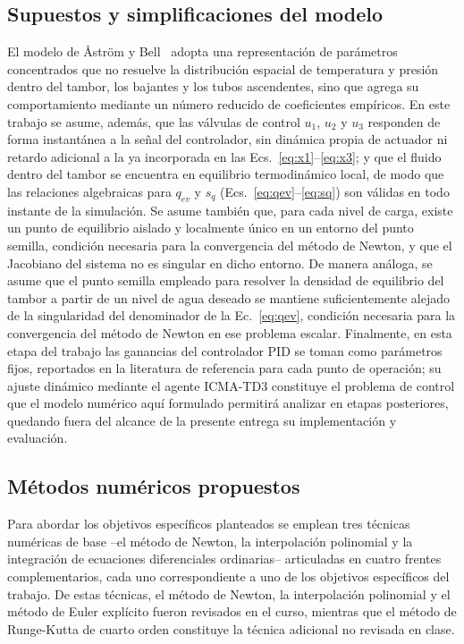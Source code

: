 \documentclass[final,5p,times,twocolumn,authoryear,11pt]{elsarticle}
\begin{document}
\subsection{Supuestos y simplificaciones del modelo}

El modelo de Åström y Bell~\citep{astrom2000drum} adopta una representación de parámetros concentrados que no resuelve la distribución espacial de temperatura y presión dentro del tambor, los bajantes y los tubos ascendentes, sino que agrega su comportamiento mediante un número reducido de coeficientes empíricos. En este trabajo se asume, además, que las válvulas de control $u_1$, $u_2$ y $u_3$ responden de forma instantánea a la señal del controlador, sin dinámica propia de actuador ni retardo adicional a la ya incorporada en las Ecs.~\eqref{eq:x1}--\eqref{eq:x3}; y que el fluido dentro del tambor se encuentra en equilibrio termodinámico local, de modo que las relaciones algebraicas para $q_{ev}$ y $s_q$ (Ecs.~\eqref{eq:qev}--\eqref{eq:sq}) son válidas en todo instante de la simulación. Se asume también que, para cada nivel de carga, existe un punto de equilibrio aislado y localmente único en un entorno del punto semilla, condición necesaria para la convergencia del método de Newton, y que el Jacobiano del sistema no es singular en dicho entorno. De manera análoga, se asume que el punto semilla empleado para resolver la densidad de equilibrio del tambor a partir de un nivel de agua deseado se mantiene suficientemente alejado de la singularidad del denominador de la Ec.~\eqref{eq:qev}, condición necesaria para la convergencia del método de Newton en ese problema escalar. Finalmente, en esta etapa del trabajo las ganancias del controlador PID se toman como parámetros fijos, reportados en la literatura de referencia para cada punto de operación; su ajuste dinámico mediante el agente ICMA-TD3 constituye el problema de control que el modelo numérico aquí formulado permitirá analizar en etapas posteriores, quedando fuera del alcance de la presente entrega su implementación y evaluación.

\subsection{Métodos numéricos propuestos}

Para abordar los objetivos específicos planteados se emplean tres técnicas numéricas de base --el método de Newton, la interpolación polinomial y la integración de ecuaciones diferenciales ordinarias-- articuladas en cuatro frentes complementarios, cada uno correspondiente a uno de los objetivos específicos del trabajo. De estas técnicas, el método de Newton, la interpolación polinomial y el método de Euler explícito fueron revisados en el curso, mientras que el método de Runge-Kutta de cuarto orden constituye la técnica adicional no revisada en clase.
\end{document}
